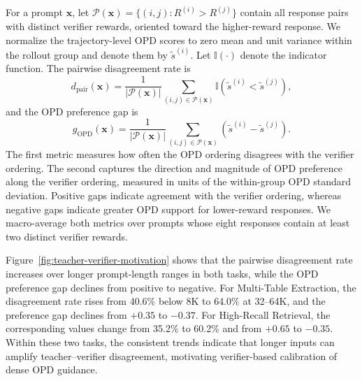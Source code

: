 For a prompt $\mathbf{x}$, let $\mathcal{P}(\mathbf{x})=\{(i,j):R^{(i)}>R^{(j)}\}$ contain all response pairs with distinct verifier rewards, oriented toward the higher-reward response. We normalize the trajectory-level OPD scores to zero mean and unit variance within the rollout group and denote them by $\tilde{s}^{(i)}$. Let $\mathbb{I}(\cdot)$ denote the indicator function. The pairwise disagreement rate is
\begin{equation}
d_{\mathrm{pair}}(\mathbf{x})=
\frac{1}{|\mathcal{P}(\mathbf{x})|}
\sum_{(i,j)\in\mathcal{P}(\mathbf{x})}
\mathbb{I}(\tilde{s}^{(i)}<\tilde{s}^{(j)}),
\label{eq:pairwise-disagreement}
\end{equation}
and the OPD preference gap is
\begin{equation}
g_{\mathrm{OPD}}(\mathbf{x})=
\frac{1}{|\mathcal{P}(\mathbf{x})|}
\sum_{(i,j)\in\mathcal{P}(\mathbf{x})}
(\tilde{s}^{(i)}-\tilde{s}^{(j)}).
\label{eq:opd-preference-gap}
\end{equation}
The first metric measures how often the OPD ordering disagrees with the verifier ordering. The second captures the direction and magnitude of OPD preference along the verifier ordering, measured in units of the within-group OPD standard deviation. Positive gaps indicate agreement with the verifier ordering, whereas negative gaps indicate greater OPD support for lower-reward responses. We macro-average both metrics over prompts whose eight responses contain at least two distinct verifier rewards.

Figure~\ref{fig:teacher-verifier-motivation} shows that the pairwise disagreement rate increases over longer prompt-length ranges in both tasks, while the OPD preference gap declines from positive to negative. For Multi-Table Extraction, the disagreement rate rises from 40.6\% below 8K to 64.0\% at 32--64K, and the preference gap declines from $+0.35$ to $-0.37$. For High-Recall Retrieval, the corresponding values change from 35.2\% to 60.2\% and from $+0.65$ to $-0.35$. Within these two tasks, the consistent trends indicate that longer inputs can amplify teacher--verifier disagreement, motivating verifier-based calibration of dense OPD guidance.
